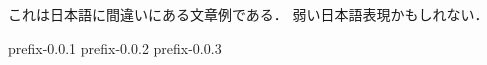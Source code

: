 \documentclass[uplatex]{jsarticle}
\begin{document}
これは日本語に間違いにある文章例である．
弱い日本語表現かもしれない．

prefix-0.0.1
prefix-0.0.2
prefix-0.0.3
\end{document}
